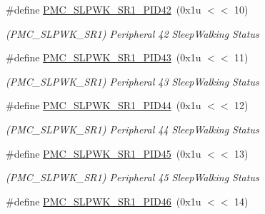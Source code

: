 \begin{DoxyCompactItemize}
\mbox{\label{group__SAMS70__PMC_ga6d4a43241f683a33688eff8f4879729d}} 
\#define \mbox{\hyperlink{group__SAMS70__PMC_ga6d4a43241f683a33688eff8f4879729d}{P\+M\+C\+\_\+\+S\+L\+P\+W\+K\+\_\+\+S\+R1\+\_\+\+P\+I\+D42}}~(0x1u $<$$<$ 10)
\begin{DoxyCompactList}\small\item\em (P\+M\+C\+\_\+\+S\+L\+P\+W\+K\+\_\+\+S\+R1) Peripheral 42 Sleep\+Walking Status \end{DoxyCompactList}\item 
\mbox{\label{group__SAMS70__PMC_gad720766db8b402dbf29662afb9f13a75}} 
\#define \mbox{\hyperlink{group__SAMS70__PMC_gad720766db8b402dbf29662afb9f13a75}{P\+M\+C\+\_\+\+S\+L\+P\+W\+K\+\_\+\+S\+R1\+\_\+\+P\+I\+D43}}~(0x1u $<$$<$ 11)
\begin{DoxyCompactList}\small\item\em (P\+M\+C\+\_\+\+S\+L\+P\+W\+K\+\_\+\+S\+R1) Peripheral 43 Sleep\+Walking Status \end{DoxyCompactList}\item 
\mbox{\label{group__SAMS70__PMC_gad69d384d0755e302da023e0af787c654}} 
\#define \mbox{\hyperlink{group__SAMS70__PMC_gad69d384d0755e302da023e0af787c654}{P\+M\+C\+\_\+\+S\+L\+P\+W\+K\+\_\+\+S\+R1\+\_\+\+P\+I\+D44}}~(0x1u $<$$<$ 12)
\begin{DoxyCompactList}\small\item\em (P\+M\+C\+\_\+\+S\+L\+P\+W\+K\+\_\+\+S\+R1) Peripheral 44 Sleep\+Walking Status \end{DoxyCompactList}\item 
\mbox{\label{group__SAMS70__PMC_ga666904d2a504e68517ea35babee3e10f}} 
\#define \mbox{\hyperlink{group__SAMS70__PMC_ga666904d2a504e68517ea35babee3e10f}{P\+M\+C\+\_\+\+S\+L\+P\+W\+K\+\_\+\+S\+R1\+\_\+\+P\+I\+D45}}~(0x1u $<$$<$ 13)
\begin{DoxyCompactList}\small\item\em (P\+M\+C\+\_\+\+S\+L\+P\+W\+K\+\_\+\+S\+R1) Peripheral 45 Sleep\+Walking Status \end{DoxyCompactList}\item 
\mbox{\label{group__SAMS70__PMC_ga29aaa8fd35ed53437f572636b1a252db}} 
\#define \mbox{\hyperlink{group__SAMS70__PMC_ga29aaa8fd35ed53437f572636b1a252db}{P\+M\+C\+\_\+\+S\+L\+P\+W\+K\+\_\+\+S\+R1\+\_\+\+P\+I\+D46}}~(0x1u $<$$<$ 14)
$$
\end{DoxyCompactItemize}
